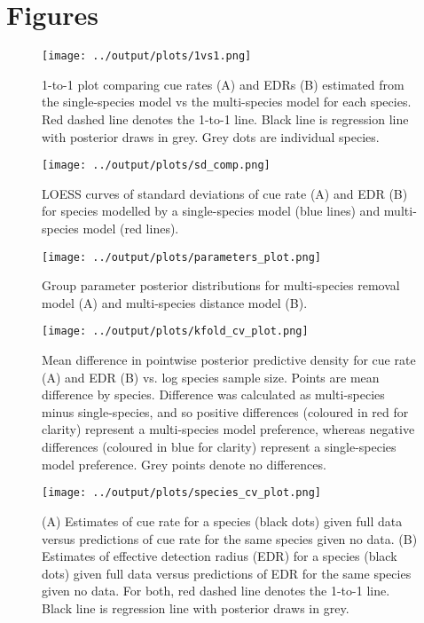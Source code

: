 \documentclass[12pt]{article}
\begin{document}


\section{Figures}

\begin{figure}[h]
	\texttt{[image: ../output/plots/1vs1.png]}
	\caption{1-to-1 plot comparing cue rates (A) and EDRs (B) estimated from the single-species model vs the multi-species model for each species. Red dashed line denotes the 1-to-1 line. Black line is regression line with posterior draws in grey. Grey dots are individual species.}
	\label{fig:1vs1}
\end{figure}

\begin{figure}[h]
	\texttt{[image: ../output/plots/sd\_comp.png]}
	\caption{LOESS curves of standard deviations of cue rate (A) and EDR (B) for species modelled by a single-species model (blue lines) and multi-species model (red lines).}
	\label{fig:sd}
\end{figure}

\begin{figure}[h]
	\texttt{[image: ../output/plots/parameters\_plot.png]}
	\caption{Group parameter posterior distributions for multi-species removal model (A) and multi-species distance model (B).}
	\label{fig:params}
\end{figure}

\begin{figure}[h]
	\texttt{[image: ../output/plots/kfold\_cv\_plot.png]}
	\caption{Mean difference in pointwise posterior predictive density for cue rate (A) and EDR (B) vs. log species sample size. Points are mean difference by species. Difference was calculated as multi-species minus single-species, and so positive differences (coloured in red for clarity) represent a multi-species model preference, whereas negative differences (coloured in blue for clarity) represent a single-species model preference. Grey points denote no differences. }
	\label{fig:cv}
\end{figure}

\begin{figure}[h]
	\texttt{[image: ../output/plots/species\_cv\_plot.png]}
	\caption{(A) Estimates of cue rate for a species (black dots) given full data versus predictions of cue rate for the same species given no data. (B) Estimates of effective detection radius (EDR) for a species (black dots) given full data versus predictions of EDR for the same species given no data. For both, red dashed line denotes the 1-to-1 line. Black line is regression line with posterior draws in grey.}
	\label{fig:species_cv}
\end{figure}
\end{document}
